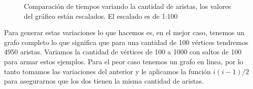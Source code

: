 \begin{figure}[H]

\caption{Comparación de tiempos variando la cantidad de aristas, los valores del gráfico están escalados. El escalado es de 1:100}
\end{figure}

Para generar estas variaciones lo que hacemos es, en el mejor caso, tenemos un grafo completo lo que significa que para una cantidad de 100 vértices tendremos 4950 aristas.
Variamos la cantidad de vértices de 100 a 1000 con saltos de 100 para armar estos ejemplos. Para el peor caso tenemos un grafo en linea, por lo tanto tomamos las variaciones
del anterior y le aplicamos la función $i(i-1)/2$ para asegurarnos que los dos tienen la misma cantidad de aristas. 


